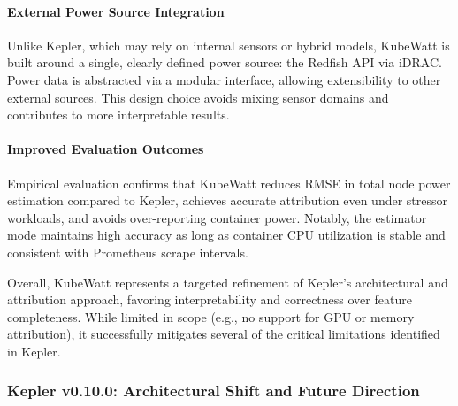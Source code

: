 \paragraph{External Power Source Integration}
Unlike Kepler, which may rely on internal sensors or hybrid models, KubeWatt is built around a single, clearly defined power source: the Redfish API via iDRAC. Power data is abstracted via a modular interface, allowing extensibility to other external sources. This design choice avoids mixing sensor domains and contributes to more interpretable results.

\paragraph{Improved Evaluation Outcomes}
Empirical evaluation confirms that KubeWatt reduces RMSE in total node power estimation compared to Kepler, achieves accurate attribution even under stressor workloads, and avoids over-reporting container power. Notably, the estimator mode maintains high accuracy as long as container CPU utilization is stable and consistent with Prometheus scrape intervals.

Overall, KubeWatt represents a targeted refinement of Kepler's architectural and attribution approach, favoring interpretability and correctness over feature completeness. While limited in scope (e.g., no support for GPU or memory attribution), it successfully mitigates several of the critical limitations identified in Kepler.

\subsubsection{Kepler v0.10.0: Architectural Shift and Future Direction}
\label{sec:kepler-new-version}











